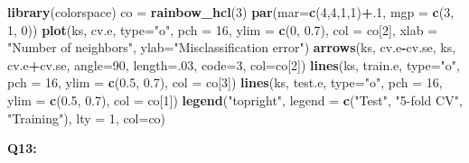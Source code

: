 \documentclass[]{article}
\newenvironment{Shaded}{\begin{snugshade}}{\end{snugshade}}
\newcommand{\KeywordTok}[1]{\textcolor[rgb]{0.13,0.29,0.53}{\textbf{#1}}}
\newcommand{\DataTypeTok}[1]{\textcolor[rgb]{0.13,0.29,0.53}{#1}}
\newcommand{\DecValTok}[1]{\textcolor[rgb]{0.00,0.00,0.81}{#1}}
\newcommand{\FloatTok}[1]{\textcolor[rgb]{0.00,0.00,0.81}{#1}}
\newcommand{\StringTok}[1]{\textcolor[rgb]{0.31,0.60,0.02}{#1}}
\newcommand{\OperatorTok}[1]{\textcolor[rgb]{0.81,0.36,0.00}{\textbf{#1}}}
\newcommand{\NormalTok}[1]{#1}
\begin{document}
\begin{Shaded}
\begin{Highlighting}[]
\KeywordTok{library}\NormalTok{(colorspace)}
\NormalTok{co =}\StringTok{ }\KeywordTok{rainbow_hcl}\NormalTok{(}\DecValTok{3}\NormalTok{)}
\KeywordTok{par}\NormalTok{(}\DataTypeTok{mar=}\KeywordTok{c}\NormalTok{(}\DecValTok{4}\NormalTok{,}\DecValTok{4}\NormalTok{,}\DecValTok{1}\NormalTok{,}\DecValTok{1}\NormalTok{)}\OperatorTok{+}\NormalTok{.}\DecValTok{1}\NormalTok{, }\DataTypeTok{mgp =} \KeywordTok{c}\NormalTok{(}\DecValTok{3}\NormalTok{, }\DecValTok{1}\NormalTok{, }\DecValTok{0}\NormalTok{))}
\KeywordTok{plot}\NormalTok{(ks, cv.e, }\DataTypeTok{type=}\StringTok{"o"}\NormalTok{, }\DataTypeTok{pch =} \DecValTok{16}\NormalTok{, }\DataTypeTok{ylim =} \KeywordTok{c}\NormalTok{(}\DecValTok{0}\NormalTok{, }\FloatTok{0.7}\NormalTok{), }\DataTypeTok{col =}\NormalTok{ co[}\DecValTok{2}\NormalTok{],}
     \DataTypeTok{xlab =} \StringTok{"Number of neighbors"}\NormalTok{, }\DataTypeTok{ylab=}\StringTok{"Misclassification error"}\NormalTok{)}
\KeywordTok{arrows}\NormalTok{(ks, cv.e}\OperatorTok{-}\NormalTok{cv.se, ks, cv.e}\OperatorTok{+}\NormalTok{cv.se, }\DataTypeTok{angle=}\DecValTok{90}\NormalTok{, }\DataTypeTok{length=}\NormalTok{.}\DecValTok{03}\NormalTok{, }\DataTypeTok{code=}\DecValTok{3}\NormalTok{, }\DataTypeTok{col=}\NormalTok{co[}\DecValTok{2}\NormalTok{])}
\KeywordTok{lines}\NormalTok{(ks, train.e, }\DataTypeTok{type=}\StringTok{"o"}\NormalTok{, }\DataTypeTok{pch =} \DecValTok{16}\NormalTok{, }\DataTypeTok{ylim =} \KeywordTok{c}\NormalTok{(}\FloatTok{0.5}\NormalTok{, }\FloatTok{0.7}\NormalTok{), }\DataTypeTok{col =}\NormalTok{ co[}\DecValTok{3}\NormalTok{])}
\KeywordTok{lines}\NormalTok{(ks, test.e, }\DataTypeTok{type=}\StringTok{"o"}\NormalTok{, }\DataTypeTok{pch =} \DecValTok{16}\NormalTok{, }\DataTypeTok{ylim =} \KeywordTok{c}\NormalTok{(}\FloatTok{0.5}\NormalTok{, }\FloatTok{0.7}\NormalTok{), }\DataTypeTok{col =}\NormalTok{ co[}\DecValTok{1}\NormalTok{])}
\KeywordTok{legend}\NormalTok{(}\StringTok{"topright"}\NormalTok{, }\DataTypeTok{legend =} \KeywordTok{c}\NormalTok{(}\StringTok{"Test"}\NormalTok{, }\StringTok{"5-fold CV"}\NormalTok{, }\StringTok{"Training"}\NormalTok{), }\DataTypeTok{lty =} \DecValTok{1}\NormalTok{, }\DataTypeTok{col=}\NormalTok{co)}
\end{Highlighting}
\end{Shaded}

\textbf{Q13:}
\end{document}
